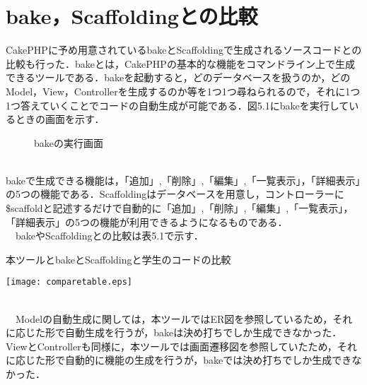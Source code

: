 \documentclass{funthesis}
\begin{document}
\section{bake，Scaffoldingとの比較}
CakePHPに予め用意されているbakeとScaffoldingで生成されるソースコードとの比較も行った．bakeとは，CakePHPの基本的な機能をコマンドライン上で生成できるツールである．bakeを起動すると，どのデータベースを扱うのか，どのModel，View，Controllerを生成するのか等を1つ1つ尋ねられるので，それに1つ1つ答えていくことでコードの自動生成が可能である．図5.1にbakeを実行しているときの画面を示す．
\begin{figure}[h!]
\begin{center}
\caption{bakeの実行画面}
\end{center}
\end{figure}
\\
bakeで生成できる機能は，「追加」,「削除」,「編集」,「一覧表示」，「詳細表示」の5つの機能である．Scaffoldingはデータベースを用意し，コントローラーに\$scaffoldと記述するだけで自動的に「追加」,「削除」,「編集」,「一覧表示」，「詳細表示」の5つの機能が利用できるようになるものである．\\
　bakeやScaffoldingとの比較は表5.1で示す．
\begin{table}[h!]
\begin{center}
\caption{本ツールとbakeとScaffoldingと学生のコードの比較}
\texttt{[image: comparetable.eps]}
\end{center}
\end{table}
\\
　Modelの自動生成に関しては，本ツールではER図を参照しているため，それに応じた形で自動生成を行うが，bakeは決め打ちでしか生成できなかった．ViewとControllerも同様に，本ツールでは画面遷移図を参照していたため，それに応じた形で自動的に機能の生成を行うが，bakeでは決め打ちでしか生成できなかった．\\
\end{document}
